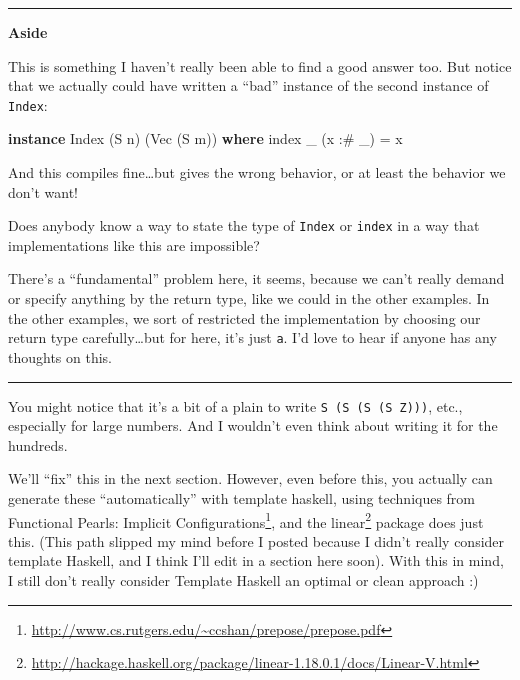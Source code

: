 \documentclass[]{article}
\newenvironment{Shaded}{}{}
\newcommand{\KeywordTok}[1]{\textcolor[rgb]{0.00,0.44,0.13}{\textbf{{#1}}}}
\newcommand{\DataTypeTok}[1]{\textcolor[rgb]{0.56,0.13,0.00}{{#1}}}
\newcommand{\FunctionTok}[1]{\textcolor[rgb]{0.02,0.16,0.49}{{#1}}}
\newcommand{\NormalTok}[1]{{#1}}
\renewcommand{\href}[2]{#2\footnote{\url{#1}}}
\begin{document}
\begin{center}\rule{0.5\linewidth}{\linethickness}\end{center}

\textbf{Aside}

This is something I haven't really been able to find a good answer too.
But notice that we actually could have written a ``bad'' instance of the
second instance of \texttt{Index}:

\begin{Shaded}
\begin{Highlighting}[]
\KeywordTok{instance} \DataTypeTok{Index} \NormalTok{(}\DataTypeTok{S} \NormalTok{n) (}\DataTypeTok{Vec} \NormalTok{(}\DataTypeTok{S} \NormalTok{m)) }\KeywordTok{where}
    \NormalTok{index _ (x }\FunctionTok{:#} \NormalTok{_) }\FunctionTok{=} \NormalTok{x}
\end{Highlighting}
\end{Shaded}

And this compiles fine\ldots{}but gives the wrong behavior, or at least
the behavior we don't want!

Does anybody know a way to state the type of \texttt{Index} or
\texttt{index} in a way that implementations like this are impossible?

There's a ``fundamental'' problem here, it seems, because we can't
really demand or specify anything by the return type, like we could in
the other examples. In the other examples, we sort of restricted the
implementation by choosing our return type carefully\ldots{}but for
here, it's just \texttt{a}. I'd love to hear if anyone has any thoughts
on this.

\begin{center}\rule{0.5\linewidth}{\linethickness}\end{center}

You might notice that it's a bit of a plain to write
\texttt{S\ (S\ (S\ (S\ Z)))}, etc., especially for large numbers. And I
wouldn't even think about writing it for the hundreds.

We'll ``fix'' this in the next section. However, even before this, you
actually can generate these ``automatically'' with template haskell,
using techniques from
\href{http://www.cs.rutgers.edu/~ccshan/prepose/prepose.pdf}{Functional
Pearls: Implicit Configurations}, and the
\href{http://hackage.haskell.org/package/linear-1.18.0.1/docs/Linear-V.html}{linear}
package does just this. (This path slipped my mind before I posted
because I didn't really consider template Haskell, and I think I'll edit
in a section here soon). With this in mind, I still don't really
consider Template Haskell an optimal or clean approach :)
\end{document}
